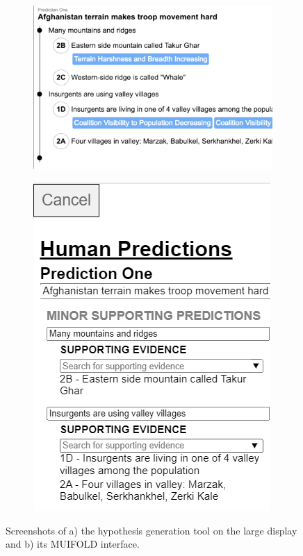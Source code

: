 \begin{figure}
\centering
    \begin{subfigure}[b]{.5\linewidth}
        \includegraphics[width=\linewidth]{chapters/04_muifold/figures/hypthosis_generator.png}
    \end{subfigure}
    \begin{subfigure}[b]{.25\linewidth}
        \includegraphics[width=\linewidth]{chapters/04_muifold/figures/hypthosis_muifold.png}
    \end{subfigure}
    \caption{Screenshots of a) the hypothesis generation tool on the large display and b) its MUIFOLD interface.}
    \label{fig:prediction_ui}
\end{figure}

